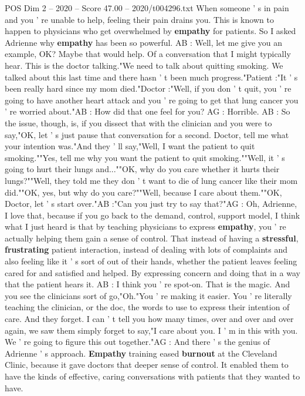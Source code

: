 \begin{textsample}{POS Dim 2 – 2020 – Score 47.00 – 2020/t004296.txt}
When someone ' s in pain and you ' re unable to help, feeling their pain drains you.
This is known to happen to physicians who get overwhelmed by \textbf{empathy} for patients.
So I asked Adrienne why \textbf{empathy} has been so powerful.
AB : Well, let me give you an example, OK?
Maybe that would help.
Of a conversation that I might typically hear.
This is the doctor talking."We need to talk about quitting smoking.
We talked about this last time and there hasn ' t been much progress."Patient :"It ' s been really hard since my mom died."Doctor :"Well, if you don ' t quit, you ' re going to have another heart attack and you ' re going to get that lung cancer you ' re worried about."AB : How did that one feel for you?
AG : Horrible.
AB : So the issue, though, is, if you dissect that with the clinician and you were to say,"OK, let ' s just pause that conversation for a second.
Doctor, tell me what your intention was."And they ' ll say,"Well, I want the patient to quit smoking.""Yes, tell me why you want the patient to quit smoking.""Well, it ' s going to hurt their lungs and...""OK, why do you care whether it hurts their lungs?""Well, they told me they don ' t want to die of lung cancer like their mom did.""OK, yes, but why do you care?""Well, because I care about them.""OK, Doctor, let ' s start over."AB :"Can you just try to say that?"AG : Oh, Adrienne, I love that, because if you go back to the demand, control, support model, I think what I just heard is that by teaching physicians to express \textbf{empathy}, you ' re actually helping them gain a sense of control.
That instead of having a \textbf{stressful}, \textbf{frustrating} patient interaction, instead of dealing with lots of complaints and also feeling like it ' s sort of out of their hands, whether the patient leaves feeling cared for and satisfied and helped.
By expressing concern and doing that in a way that the patient hears it.
AB : I think you ' re spot-on.
That is the magic.
And you see the clinicians sort of go,"Oh."You ' re making it easier.
You ' re literally teaching the clinician, or the doc, the words to use to express their intention of care.
And they forget.
I can ' t tell you how many times, over and over and over again, we saw them simply forget to say,"I care about you.
I ' m in this with you.
We ' re going to figure this out together."AG : And there ' s the genius of Adrienne ' s approach. \textbf{Empathy} training eased \textbf{burnout} at the Cleveland Clinic, because it gave doctors that deeper sense of control.
It enabled them to have the kinds of effective, caring conversations with patients that they wanted to have.

\end{textsample}

